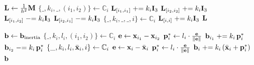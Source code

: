 \begin{algorithm}[H]
\caption{Construct constant system matrix (LHS) for PD mass-spring system.}
\label{alg:PD_mass_spring_LHS}
\begin{algorithmic}[1]
\addtolength{\itemsep}{0.5ex}
    \State $\mathbf{L} \gets \frac{1}{h^2}\mathbf{M}$ 
            \State $\{\_, k_i, \_, (i_1, i_2)\} \gets \mathbb{C}_i$
            \State $\mathbf{L}_{[i_1, i_1]} \mathrel{+}= k_i\mathbf{I}_{3}$
            \State $\mathbf{L}_{[i_2, i_2]} \mathrel{+}= k_i\mathbf{I}_{3}$
            \State $\mathbf{L}_{[i_1, i_2]} \mathrel{-}= k_i\mathbf{I}_{3}$
            \State $\mathbf{L}_{[i_2, i_1]} \mathrel{-}= k_i\mathbf{I}_{3}$
            \State $\{\_, k_i, \_, \_, i\} \gets \mathbb{C}_i$
            \State $\mathbf{L}_{[i, i]} \mathrel{+}= k_i\mathbf{I}_{3}$
        \EndIf
    \EndFor
    \State \Return $\mathbf{L}$
\EndFunction
\end{algorithmic}
\end{algorithm}


\begin{algorithm}[H]
\caption{RHS assembly for PD mass-spring system.}
\label{alg:PD_mass_spring_RHS}
\begin{algorithmic}[1]
\addtolength{\itemsep}{0.5ex}
    \State $\mathbf{b} \gets \mathbf{b}_{\text{inertia}}$
            \State $\{\_, k_i, l_i, (i_1, i_2)\} \gets \mathbb{C}_i$
            \State $\mathbf{e} \gets \mathbf{x}_{i_1} - \mathbf{x}_{i_2}$
            \State $\mathbf{p}_i^* \gets l_i \cdot \frac{\mathbf{e}}{\|\mathbf{e}\|}$ 
            \State $\mathbf{b}_{i_1} \mathrel{+}= k_i\,\mathbf{p}_i^*$
            \State $\mathbf{b}_{i_2} \mathrel{-}= k_i\,\mathbf{p}_i^*$
            \State $\{\_, k_i, l_i, \bar{\mathbf{x}}_i, i\} \gets \mathbb{C}_i$
            \State $\mathbf{e} \gets \mathbf{x}_{i} - \bar{\mathbf{x}}_i$
            \State $\mathbf{p}_i^* \gets l_i \cdot \frac{\mathbf{e}}{\|\mathbf{e}\|}$
            \State $\mathbf{b}_{i} \mathrel{+}= k_i\,(\bar{\mathbf{x}}_i + \mathbf{p}_i^*)$
        \EndIf
    \EndFor
    \State \Return $\mathbf{b}$
\EndFunction
\end{algorithmic}
\end{algorithm}

